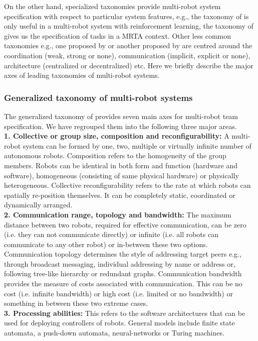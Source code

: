 On the other hand, specialized taxonomies provide multi-robot system specification with respect to particular system features, e.g., the taxonomy of  is only useful in a multi-robot system with reinforcement learning, the taxonomy of  gives us the specification of tasks in a MRTA context. Other less common taxonomies e.g., one proposed by  or another proposed by  are centred around the coordination (weak, strong or none), communication (implicit, explicit or none), architecture (centralized or decentralized) etc. Here we briefly describe the major axes of leading taxonomies of multi-robot systems.
\subsubsection*{Generalized taxonomy of multi-robot systems}
The generalized taxonomy of  provides seven main axes for multi-robot team specification. We have regrouped them into the following three major areas.\\
\textbf{1. Collective or group size, composition and reconfigurability: }  A multi-robot system can be formed by one, two, multiple or virtually infinite number of autonomous robots. Composition refers to the homogeneity of the group members. Robots can be identical in both form and function (hardware and software), homogeneous (consisting of same physical hardware) or physically heterogeneous. Collective reconfigurability refers to the rate at which robots can spatially re-position themselves. It can be completely static, coordinated or dynamically arranged.\\
\textbf{2. Communication range, topology and bandwidth: } The maximum distance between two robots, required for effective communication, can be zero (i.e. they can not communicate directly) or infinite (i.e. all robots can communicate to any other robot) or in-between these two options. Communication topology determines the style of addressing target peers e.g., through broadcast messaging, individual addressing by name or address or, following tree-like hierarchy or redundant graphs. Communication bandwidth provides the measure of costs associated with communication. This can be no cost (i.e. infinite bandwidth) or high cost (i.e. limited or no bandwidth) or something in between these two extreme cases.\\
\textbf{3. Processing abilities: } This refers to the software architectures that can be used for deploying controllers of robots. General models include finite state automata, a push-down automata, neural-networks or Turing machines. 
